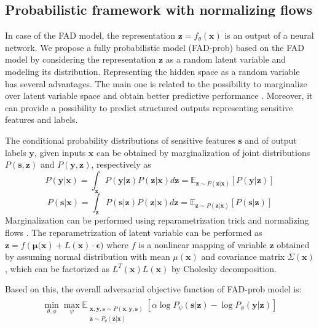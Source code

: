 \documentclass[preprint,12pt]{elsarticle}
\begin{document}
\subsection{Probabilistic framework with normalizing flows}
\label{Sec:advenet-nf}
In case of the FAD model, the representation $\mathbf{z}=f_\theta(\mathbf{x})$ is an output of a neural network. We propose a fully probabilistic model (FAD-prob) based on the FAD model by considering the representation $\mathbf{z}$ as a random latent variable and modeling its distribution. Representing the hidden space as a random variable has several advantages. The main one is related to the possibility to marginalize over latent variable space and obtain better predictive performance \cite{tan2010social}. Moreover, it can provide a possibility to predict structured outputs \cite{koller2009probabilistic} representing sensitive features and labels.

The conditional probability distributions of sensitive features $\mathbf{s}$ and of output labels $\mathbf{y}$,  given inputs $\mathbf{x}$ can be obtained by marginalization of joint distributions $P(\mathbf{s},\mathbf{z})$ and $P(\mathbf{y},\mathbf{z})$, respectively as 
$$ P(\mathbf{y}|\mathbf{x}) = \int_\mathbf{z} P(\mathbf{y}|\mathbf{z}) P(\mathbf{z}|\mathbf{x}) d\mathbf{z} = \mathbb{E}_{\mathbf{z} \sim P(\mathbf{z}|\mathbf{x})} [P(\mathbf{y}|\mathbf{z})]$$
$$ P(\mathbf{s}|\mathbf{x}) = \int_\mathbf{z} P(\mathbf{s}|\mathbf{z}) P(\mathbf{z}|\mathbf{x}) d\mathbf{z} = \mathbb{E}_{\mathbf{z} \sim P(\mathbf{z}|\mathbf{x})} [P(\mathbf{s}|\mathbf{z})]$$
Marginalization can be performed using reparametrization trick and normalizing flows \cite{kingma2019introduction}. The reparametrization of latent variable can be performed as $\mathbf{z} = f(\mathbf{\mu(\mathbf{x}})+ L(\mathbf{x})\cdot \mathbf{\epsilon})$
where $f$ is a nonlinear mapping of variable $\mathbf{z}$ obtained by assuming normal distribution with mean $\mu(\mathbf{x})$ and covariance matrix $\Sigma(\mathbf{x})$, which can be factorized as $L^T(\mathbf{x})L(\mathbf{x})$ by Cholesky decomposition.

Based on this, the overall adversarial objective function of FAD-prob model is:
\begin{gather*} 
\begin{split}
\min_{\theta,\phi}\max_{\psi}\mathbb{E}_{\substack{\mathbf{x},\mathbf{y}, \mathbf{s} \sim P(\mathbf{x},\mathbf{y},\mathbf{s})\\\mathbf{z} \sim P_\theta(\mathbf{z}|\mathbf{x})}} \left[\alpha \log P_{\psi}(\mathbf{s}|\mathbf{z})  - \log P_{\phi}(\mathbf{y}|\mathbf{z})\right]
\end{split}
\end{gather*}
\end{document}
